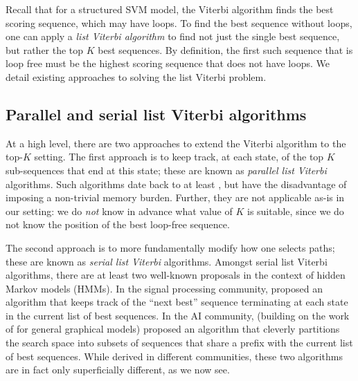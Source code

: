 

Recall that for a structured SVM model,
the Viterbi algorithm %
finds the best scoring sequence, which may have loops.
To find the best sequence without loops, one can apply a \emph{list Viterbi algorithm}
to find not just the single best sequence,
but rather the top $K$ best sequences.
By definition, the first such sequence that is loop free must be the highest scoring sequence that does not have loops.
We detail existing approaches to solving the list Viterbi problem.

%
\subsection{Parallel and serial list Viterbi algorithms}

At a high level, there are two approaches to extend the Viterbi algorithm to the top-$K$ setting.
The first approach is to keep track, at each state, of the top $K$ sub-sequences that end at this state; these are known as \emph{parallel list Viterbi} algorithms.
Such algorithms date back to at least \citet{Forney:1973},
but have the disadvantage of imposing a non-trivial memory burden.
Further, they are not applicable as-is in our setting:
we do \emph{not} know in advance what value of $K$ is suitable,
since we do not know the position of the best loop-free sequence.

The second approach is to more fundamentally modify how one selects paths; these are known as \emph{serial list Viterbi} algorithms.
Amongst serial list Viterbi algorithms, there are at least two well-known proposals in the context of hidden Markov models (HMMs).
In the signal processing community, \citet{seshadri1994list} proposed an algorithm that keeps track of the ``next best'' sequence terminating at each state in the current list of best sequences.
In the AI community, \citet{nilsson2001sequentially} (building on the work of \citet{Nilsson:1998} for general graphical models) proposed an algorithm that cleverly partitions the search space into subsets of sequences that share a prefix with the current list of best sequences.
While derived in different communities, these two algorithms are in fact only superficially different, as we now see.

